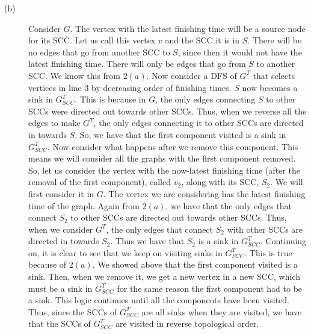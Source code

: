\documentclass{article}
\begin{document}
\begin{description}
    \item[(b)]
        Consider $G$. The vertex with the latest finishing time will be a source node for its
        SCC. Let us call this vertex $v$ and the SCC it is in $S$. There will be no edges that go from
        another SCC to $S$, since
        then it would not have the latest finishing time. There will only be
        edges that go from $S$ to another SCC. We know this from $2(a)$.
        Now consider a DFS of $G^T$ that selects vertices in line $3$ by
        decreasing order of finishing times. $S$ now becomes a sink in $G^T_{SCC}$.
        This is because in $G$, the only edges connecting $S$ to
        other SCCs were directed out towards other SCCs. Thus, when we reverse
        all the edges to make $G^T$, the only edges connecting it to other SCCs
        are directed in towards $S$. So, we have that the first component visited is a sink
        in $G^T_{SCC}$.
        Now consider what happens after we remove this component. This means
        we will consider all the graphs with the first component removed. So, let
        us consider the vertex with the now-latest finishing time (after the
        removal of the first component), called
        $v_2$, along with its SCC, $S_2$. We will first
        consider it in $G$. The vertex we
        are considering has the latest finishing time of the graph. Again from
        $2(a)$, we have that the only edges that connect $S_2$ to other SCCs are
        directed out towards other SCCs. Thus, when we consider $G^T$, the only
        edges that connect $S_2$ with other SCCs are directed in towards $S_2$.
        Thus we have that $S_2$ is a sink in $G^T_{SCC}$. Continuing on, it is
        clear to see that we keep on visiting sinks in $G^T_{SCC}$. This is true
        because of $2(a)$. We showed above that the first component visited is a
        sink. Then, when we remove it, we get a new vertex in a new SCC, which
        must be a sink in $G^T_{SCC}$ for the same reason the first component
        had to be a sink. This logic continues until all the components have
        been visited. Thus, since the SCCs of $G^T_{SCC}$ are all sinks
        when they are visited, we have that the SCCs of $G^T_{SCC}$ are visited
        in reverse topological order.


\end{description}
\end{document}
